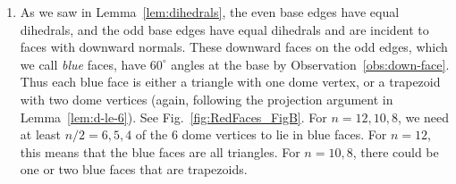 \documentclass[11pt]{article}
\newcommand{\secref}[1]{\ref{sec:#1}}
\newcommand{\figref}[1]{\ref{fig:#1}}
\newcommand{\JOR}[1]{{\color{red} JOR: [#1]}}
\newcommand{\Anna}[1]{{\color{red} Anna: [#1]}}
\newcommand{\anna}[1]{{\color{blue} #1}}
\begin{document}
\begin{enumerate}[(1)]
%
\item
As we saw in Lemma~\ref{lem:dihedrals},
the even %
base edges have equal dihedrals, and the odd %
base edges have equal dihedrals and are incident to faces with downward normals.
%
These downward faces on the odd %
edges, which we call %
\emph{blue}
faces, have $60^\circ$ angles at the base
by Observation~\ref{obs:down-face}. 
Thus each blue face is
either a triangle
with one 
dome
vertex, 
or a trapezoid with two 
dome
vertices (again, following the projection argument in 
Lemma~\ref{lem:d-le-6}).
See Fig.~\figref{RedFaces_FigB}.
For $n=12,10,8$, we need at least $n/2=6,5,4$
of the $6$ dome vertices to lie in blue faces.
For $n=12$, 
this means that the 
blue
faces are all triangles.
For $n=10,8$, there could be one or two
blue faces that are trapezoids.
%
%


\end{enumerate}
\end{document}

